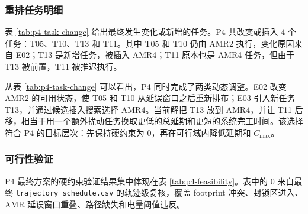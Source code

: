 \subsubsection{重排任务明细}

表 \ref{tab:p4-task-change} 给出最终发生变化或新增的任务。P4 共改变或插入 4 个任务：T05、T10、T13 和 T11。其中 T05 和 T10 仍由 AMR2 执行，变化原因来自 E02；T13 是新增任务，被插入 AMR4；T11 原本也是 AMR4 任务，但由于 T13 被前置，T11 被推迟执行。

\begin{table}[H]
\centering
\scriptsize
{}
\caption{P4 重排任务明细}
\label{tab:p4-task-change}
\end{table}

从表 \ref{tab:p4-task-change} 可以看出，P4 同时完成了两类动态调整。E02 改变 AMR2 的可用状态，使 T05 和 T10 从延误窗口之后重新排布；E03 引入新任务 T13，并通过候选插入搜索选择 AMR4。当前解把 T13 放到 AMR4，并让 T11 后移，相当于用一个额外扰动任务换取更低的总延期和更短的系统完工时间。该选择符合 P4 的目标层次：先保持硬约束为 0，再在可行域内降低延期和 $C_{\max}$。

\subsubsection{可行性验证}

P4 最终方案的硬约束验证结果集中体现在表 \ref{tab:p4-feasibility}。表中的 0 来自最终 \verb|trajectory_schedule.csv| 的轨迹级复核，覆盖 footprint 冲突、封锁区进入、AMR 延误窗口重叠、路径缺失和电量阈值违反。

